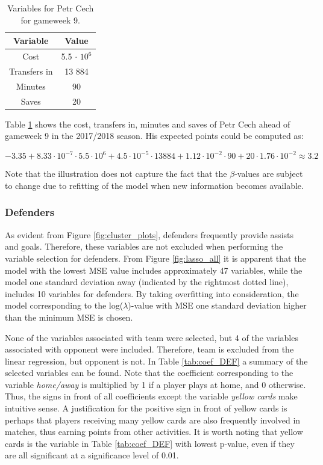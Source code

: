 \begin{table}[H]
\centering
\begin{tabular}{|c|c|}
\hline
Variable     & Value   \\ \hline
Cost         & 5.5 $\cdot$ $10^6$ \\
Transfers in & 13 884   \\
Minutes      & 90      \\
Saves        & 20     \\
\hline
\end{tabular}
\caption{Variables for Petr Cech for gameweek 9.}
\label{tab:var_petr}
\end{table}

Table \ref{tab:var_petr} shows the cost, transfers in, minutes and saves of Petr Cech ahead of gameweek 9 in the 2017/2018 season. His expected points could be computed as:

\begin{equation*}
    -3.35 + 8.33\cdot10^{-7}\cdot5.5\cdot10^6 + 4.5\cdot10^{-5}\cdot13 884 + 1.12\cdot10^{-2}\cdot90 + 20\cdot1.76\cdot10^{-2} \approx 3.2
\end{equation*}

Note that the illustration does not capture the fact that the $\beta$-values are subject to change due to refitting of the model when new information becomes available.


\subsubsection{Defenders}

As evident from Figure \ref{fig:cluster_plots}, defenders frequently provide assists and goals. Therefore, these variables are not excluded when performing the variable selection for defenders. From Figure \ref{fig:lasso_all} it is apparent that the model with the lowest MSE value includes approximately 47 variables, while the model one standard deviation away (indicated by the rightmost dotted line), includes 10 variables for defenders. By taking overfitting into consideration, the model corresponding to the log($\lambda$)-value with MSE one standard deviation higher than the minimum MSE is chosen.

\newpar

None of the variables associated with team were selected, but 4 of the variables associated with opponent were included. Therefore, team is excluded from the linear regression, but opponent is not. In Table \ref{tab:coef_DEF} a summary of the selected variables can be found. Note that the coefficient corresponding to the variable \textit{home/away} is multiplied by 1 if a player plays at home, and 0 otherwise. Thus, the signs in front of all coefficients except the variable \textit{yellow cards} make intuitive sense. A justification for the positive sign in front of yellow cards is perhaps that players receiving many yellow cards are also frequently involved in matches, thus earning points from other activities. It is worth noting that yellow cards is the variable in Table \ref{tab:coef_DEF} with lowest p-value, even if they are all significant at a significance level of 0.01.


